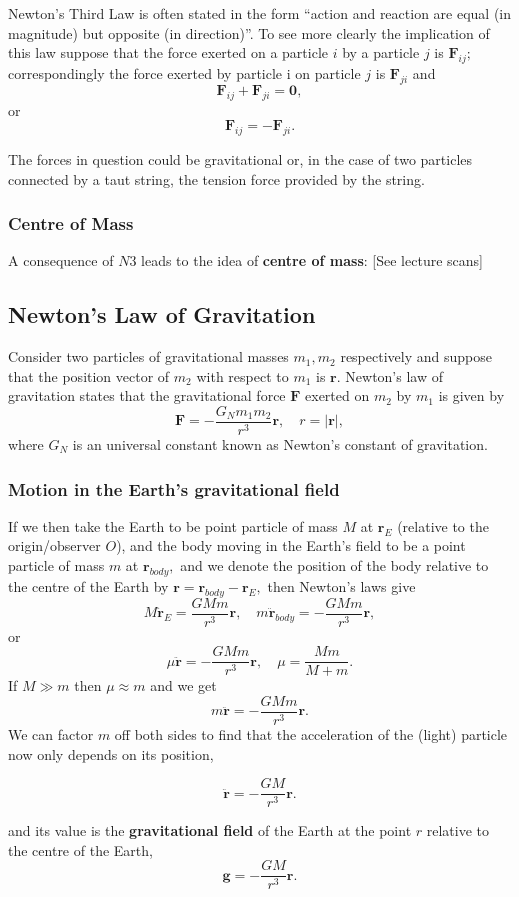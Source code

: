 \documentclass[12pt, a4paper]{article}
\theoremstyle{definition}
\theoremstyle{plain}
\begin{document}
Newton’s Third Law is often stated in the form “action and reaction are equal (in magnitude) but opposite (in direction)”. To see more clearly the implication of this law suppose that the force exerted on a particle $i$ by a particle $j$ is $\bm{F}_{ij};$ correspondingly the force exerted by particle i on particle $j$ is $\bm{F}_{ji}$ and $$\bm{F}_{ij}+\bm{F}_{ji}=\bm{0},$$ or $$\bm{F}_{ij}=-\bm{F}_{ji}.$$

The forces in question could be gravitational or, in the case of two particles connected by a taut string, the tension force provided by the string.

\subsubsection{Centre of Mass}

A consequence of $N3$ leads to the idea of \textbf{centre of mass}: [See lecture scans]



\subsection{Newton's Law of Gravitation}

Consider two particles of gravitational masses $m_1,m_2$ respectively and suppose that the position vector of $m_2$ with respect to $m_1$ is $\bm{r}.$ Newton’s law of gravitation states that the gravitational force $\bm{F}$ exerted on $m_2$ by $m_1$ is given by $$\bm{F}=-\frac{G_Nm_1m_2}{r^3}\bm{r}, \quad r=|\bm{r}|,$$ where $G_N$ is an universal constant known as Newton's constant of gravitation.

\subsubsection{Motion in the Earth’s gravitational field}

If we then take the Earth to be point particle of mass $M$ at $\bm{r}_E$ (relative to the origin/observer $O$), and the body moving in the Earth’s field to be a point particle of mass $m$ at $\bm{r}_{body},$ and we denote the position of the body relative to the centre of the Earth by $\bm{r} = \bm{r}_{body} - \bm{r}_E,$ then Newton’s laws give $$M\ddot{\bm{r}}_E=\frac{GMm}{r^3}\bm{r}, \quad m\ddot{\bm{r}}_{body}=-\frac{GMm}{r^3}\bm{r},$$ or $$\mu\ddot{\bm{r}}=-\frac{GMm}{r^3}\bm{r}, \quad \mu =\frac{Mm}{M+m}.$$ If $M\gg m$ then $\mu \approx m$ and we get $$m\ddot{\bm{r}}=-\frac{GMm}{r^3}\bm{r}.$$ We can factor $m$ off both sides to find that the acceleration of the (light) particle now only depends on its position, \begin{tcolorbox}
$$\ddot{\bm{r}}=-\frac{GM}{r^3}\bm{r}.$$
\end{tcolorbox} and its value is the \textbf{gravitational field} of the Earth at the point $r$ relative to the centre of the Earth, $$\bm{g}=-\frac{GM}{r^3}\bm{r}.$$
\end{document}
